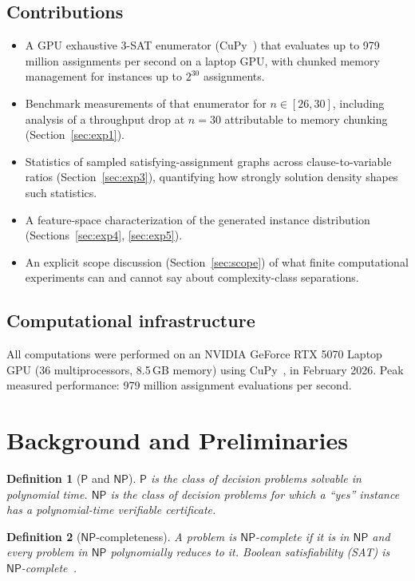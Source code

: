 \documentclass[11pt]{article}
\newtheorem{definition}{Definition}
\newcommand{\SAT}{\textsf{SAT}}
\newcommand{\NP}{\textsf{NP}}
\newcommand{\PTIME}{\textsf{P}}
\begin{document}
\subsection{Contributions}

\begin{itemize}
\item A GPU exhaustive 3-\SAT{} enumerator (CuPy~\cite{cupy}) that evaluates up to 979 million assignments per second on a laptop GPU, with chunked memory management for instances up to $2^{30}$ assignments.
\item Benchmark measurements of that enumerator for $n \in [26,30]$, including analysis of a throughput drop at $n=30$ attributable to memory chunking (Section~\ref{sec:exp1}).
\item Statistics of sampled satisfying-assignment graphs across clause-to-variable ratios (Section~\ref{sec:exp3}), quantifying how strongly solution density shapes such statistics.
\item A feature-space characterization of the generated instance distribution (Sections~\ref{sec:exp4}, \ref{sec:exp5}).
\item An explicit scope discussion (Section~\ref{sec:scope}) of what finite computational experiments can and cannot say about complexity-class separations.
\end{itemize}

\subsection{Computational infrastructure}

All computations were performed on an NVIDIA GeForce RTX 5070 Laptop GPU (36 multiprocessors, 8.5\,GB memory) using CuPy~\cite{cupy}, in February 2026. Peak measured performance: 979 million assignment evaluations per second.

\section{Background and Preliminaries}

\begin{definition}[$\PTIME$ and $\NP$]
$\PTIME$ is the class of decision problems solvable in polynomial time. $\NP$ is the class of decision problems for which a ``yes'' instance has a polynomial-time verifiable certificate.
\end{definition}

\begin{definition}[$\NP$-completeness]
A problem is $\NP$-complete if it is in $\NP$ and every problem in $\NP$ polynomially reduces to it. Boolean satisfiability (\SAT) is $\NP$-complete~\cite{Cook1971}.
\end{definition}
\end{document}
